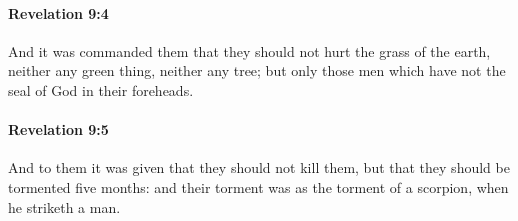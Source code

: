 		\paragraph{Revelation 9:4} %
			\label{REVELATIONNT-9-4}

			And it was commanded them that they should not hurt the grass of the earth, neither any green thing, neither any tree; but only those men which have not the seal of God in their foreheads.

			\begin{framed}
			\scriptsize
				\begin{compactdesc}
					\item[SBLG] 
				\end{compactdesc}
			\end{framed}

		\paragraph{Revelation 9:5} %
			\label{REVELATIONNT-9-5}

			And to them it was given that they should not kill them, but that they should be tormented five months: and their torment was as the torment of a scorpion, when he striketh a man.

